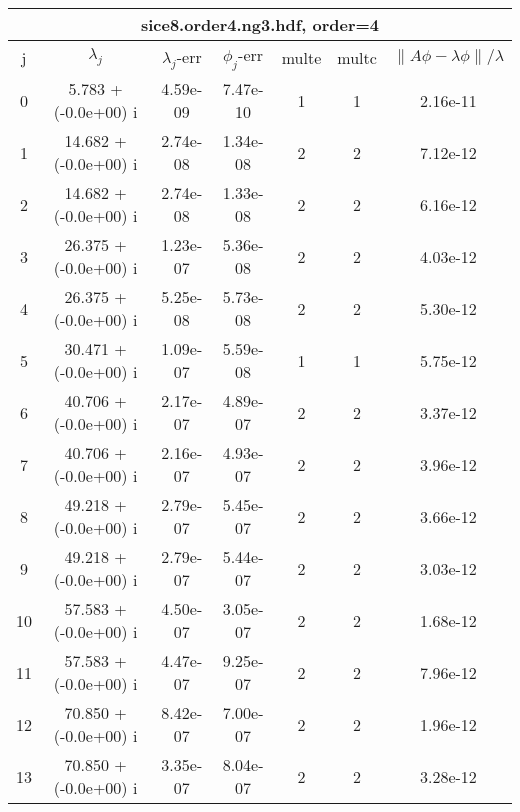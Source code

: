 \begin{table}[H]\tableFont %
\begin{center}
\begin{tabular}{|c|c|c|c|c|c|c|}  \hline
\multicolumn{7}{|c|}{sice8.order4.ng3.hdf, order=4} \\ \hline
   j    &         $\lambda_j$        & $\lambda_j$-err  & $\phi_j$-err  & multe & multc & $\| A\phi - \lambda\phi\|/\lambda$     \\ \hline
     0  &      5.783 + (-0.0e+00) i  &    4.59e-09      &   7.47e-10    &   1    &  1   &    2.16e-11 \\
     1  &     14.682 + (-0.0e+00) i  &    2.74e-08      &   1.34e-08    &   2    &  2   &    7.12e-12 \\
     2  &     14.682 + (-0.0e+00) i  &    2.74e-08      &   1.33e-08    &   2    &  2   &    6.16e-12 \\
     3  &     26.375 + (-0.0e+00) i  &    1.23e-07      &   5.36e-08    &   2    &  2   &    4.03e-12 \\
     4  &     26.375 + (-0.0e+00) i  &    5.25e-08      &   5.73e-08    &   2    &  2   &    5.30e-12 \\
     5  &     30.471 + (-0.0e+00) i  &    1.09e-07      &   5.59e-08    &   1    &  1   &    5.75e-12 \\
     6  &     40.706 + (-0.0e+00) i  &    2.17e-07      &   4.89e-07    &   2    &  2   &    3.37e-12 \\
     7  &     40.706 + (-0.0e+00) i  &    2.16e-07      &   4.93e-07    &   2    &  2   &    3.96e-12 \\
     8  &     49.218 + (-0.0e+00) i  &    2.79e-07      &   5.45e-07    &   2    &  2   &    3.66e-12 \\
     9  &     49.218 + (-0.0e+00) i  &    2.79e-07      &   5.44e-07    &   2    &  2   &    3.03e-12 \\
    10  &     57.583 + (-0.0e+00) i  &    4.50e-07      &   3.05e-07    &   2    &  2   &    1.68e-12 \\
    11  &     57.583 + (-0.0e+00) i  &    4.47e-07      &   9.25e-07    &   2    &  2   &    7.96e-12 \\
    12  &     70.850 + (-0.0e+00) i  &    8.42e-07      &   7.00e-07    &   2    &  2   &    1.96e-12 \\
    13  &     70.850 + (-0.0e+00) i  &    3.35e-07      &   8.04e-07    &   2    &  2   &    3.28e-12 \\

\end{tabular}
\end{center}
\end{table}
